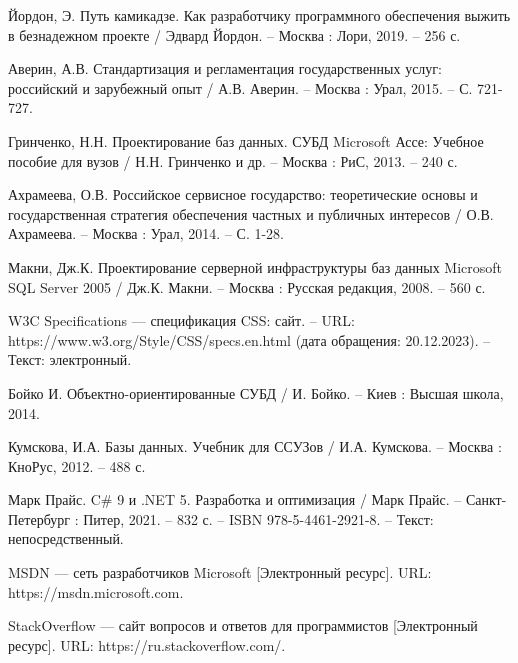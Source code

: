 \begin{thebibliography}{11}

     Йордон, Э. Путь камикадзе. Как разработчику программного обеспечения выжить в безнадежном проекте / Эдвард Йордон. – Москва : Лори, 2019. – 256 с.

     Аверин, А.В. Стандартизация и регламентация государственных услуг: российский и зарубежный опыт / А.В. Аверин. – Москва : Урал, 2015. – С. 721-727.

     Гринченко, Н.Н. Проектирование баз данных. СУБД Microsoft Ассе: Учебное пособие для вузов / Н.Н. Гринченко и др. – Москва : РиС, 2013. – 240 с.

     Ахрамеева, О.В. Российское сервисное государство: теоретические основы и государственная стратегия обеспечения частных и публичных интересов / О.В. Ахрамеева. – Москва : Урал, 2014. – С. 1-28.

     Макни, Дж.К. Проектирование серверной инфраструктуры баз данных Microsoft SQL Server 2005 / Дж.К. Макни. – Москва : Русская редакция, 2008. – 560 с.

     W3C Specifications — спецификация CSS: сайт. – URL: https://www.w3.org/Style/CSS/specs.en.html (дата обращения: 20.12.2023). – Текст: электронный.

     Бойко И. Объектно-ориентированные СУБД / И. Бойко. – Киев : Высшая школа, 2014.

     Кумскова, И.А. Базы данных. Учебник для ССУЗов / И.А. Кумскова. – Москва : КноРус, 2012. – 488 с.

     Марк Прайс. C\# 9 и .NET 5. Разработка и оптимизация / Марк Прайс. – Санкт-Петербург : Питер, 2021. – 832 с. – ISBN 978-5-4461-2921-8. – Текст: непосредственный.

     MSDN — сеть разработчиков Microsoft [Электронный ресурс]. URL: https://msdn.microsoft.com.

     StackOverflow — сайт вопросов и ответов для программистов [Электронный ресурс]. URL: https://ru.stackoverflow.com/.

\end{thebibliography}
